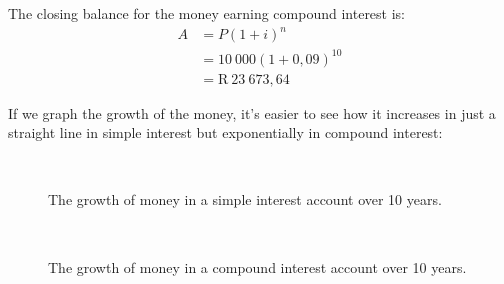 The closing balance for the money earning compound interest is:
\begin{align*}
    A &= P(1 + i)^n\\
      &= 10~000(1 + 0,09)^10\\
      &= \mbox{R}~23~673,64
\end{align*}

If we graph the growth of the money, it’s easier to see how it increases in just a straight line in simple interest but exponentially in compound interest:
\begin{figure}[H]
    \begin{center}
      \\
	\begin{caption*}The growth of money in a simple interest account over 10 years.\end{caption*}
	\label{FG:fig:SI10}
    \end{center}
\end{figure}

\begin{figure}[H]
    \begin{center}
\\
	\begin{caption*}The growth of money in a compound interest account over 10 years.\end{caption*}
	\label{FG:fig:CI10}
    \end{center}
\end{figure}

